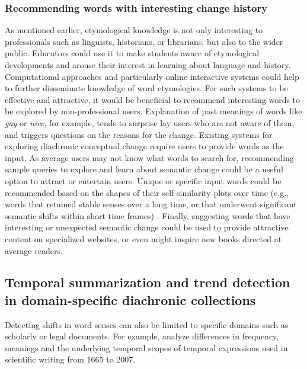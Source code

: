 \documentclass[output=paper%
]{langsci/langscibook}
\begin{document}
\subsubsection{Recommending words with interesting change history} 
As mentioned earlier, etymological knowledge is not only interesting to professionals such as linguists, historians, or librarians, but also to the wider public. Educators could use it to make students  aware of etymological developments and arouse their interest in learning about language and history.
Computational approaches and particularly online interactive systems  could  help to further disseminate knowledge of word etymologies. For such systems to be effective and attractive, it would be beneficial to recommend interesting words to be explored by non-professional users. 
Explanation of past meanings of words like \emph{gay} or \emph{nice}, for example, tends to surprise lay users who are not aware of them, and triggers  questions on the reasons for the change. Existing systems for exploring diachronic conceptual change require users to provide words as the input. As average users may not know what words to search for, recommending sample queries to explore and learn about semantic change could be a useful option to attract or entertain users.  Unique or specific input words could be recommended based on the shapes of their self-similarity plots over time (e.g., words that retained stable senses over a long time, or that underwent significant semantic shifts within short time frames) \citep{jatowt2018every}. 
Finally, suggesting words that have interesting or unexpected semantic change could be used to provide attractive content on specialized websites, or even might inspire new books directed at average readers. 

\subsection{Temporal summarization and trend detection in domain-specific diachronic collections} 
Detecting shifts in word senses can also be  limited to specific domains such as scholarly or legal documents. For example, \citet{degaetano2017diachronic} analyze differences in frequency, meanings and the underlying temporal scopes of temporal expressions used in scientific writing from 1665 to 2007. 
\end{document}
